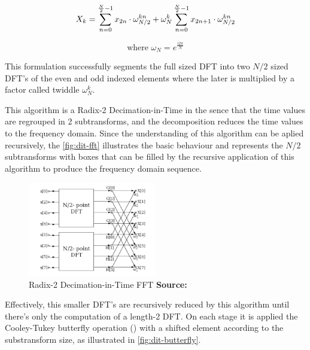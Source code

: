 \documentclass[
  oneside,
  11pt, a4paper,
  footinclude=true,
  headinclude=true,
  cleardoublepage=empty
]{scrbook}
\newcommand*{\source}[1]{%
    \textbf{Source:} \cite{#1}%
}
\begin{document}
\begin{equation} \label{eq:dit}
    X_{k} = \sum_{n=0}^{\frac{N}{2}-1}x_{2n} \cdot \omega_{N/2}^{kn} + \omega_{N}^{k} \sum_{n=0}^{\frac{N}{2}-1}x_{2n+1} \cdot \omega_{N/2}^{kn} \\
\end{equation}

\begin{equation*}
    \text{where } \omega_{N} = e^{\frac{i 2 \pi}{N}}
\end{equation*}

This formulation successfully segments the full sized DFT into two \(N/2\) sized DFT's of the even and odd indexed elements where the later is multiplied by a factor called twiddle \( \omega_{N}^{k} \). 

This algorithm is a Radix-2 Decimation-in-Time in the sence that the time values are regrouped in 2 subtransforms, and the decomposition reduces the time values to the frequency domain. Since the understanding of this algorithm can be aplied recursively, the \autoref{fig:dit-fft} illustrates the basic behaviour and represents the \(N/2\) subtransforms with boxes that can be filled by the recursive application of this algorithm to produce the frequency domain sequence.



\begin{figure}[h] 
    \centering
    \includegraphics[width=0.5\textwidth]{img/dit_fft.png}
    \caption{Radix-2 Decimation-in-Time FFT \source{jones2014digital}}
    \label{fig:dit-fft}
\end{figure}


Effectively, this smaller DFT's are recursively reduced by this algorithm until there's only the computation of a length-2 DFT. On each stage it is applied the Cooley-Tukey butterfly operation (\cite{chu1999inside}) with a shifted element according to the substransform size, as illustrated in \autoref{fig:dit-butterfly}.
\end{document}
